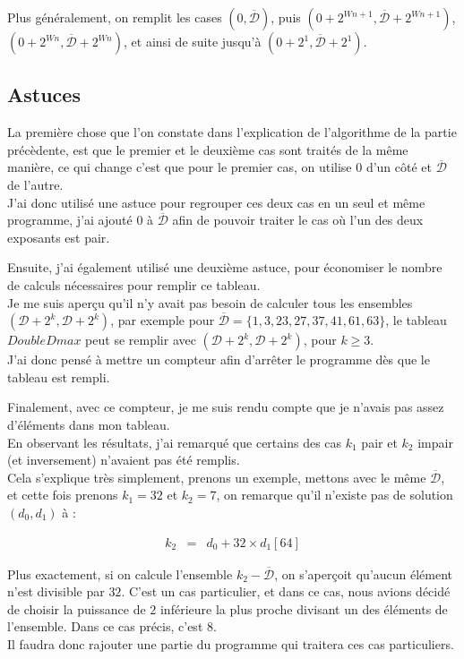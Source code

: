\documentclass[12pt, a4paper]{memoir}
\newcommand{\dbarre}{\overline{\mathcal{D}}}
\begin{document}
      Plus généralement, on remplit les cases $(0,\dbarre)$, puis $(0 + 2^{Wn+1},\dbarre + 2^{Wn+1})$, \\
      $(0 + 2^{Wn},\dbarre + 2^{Wn})$, et ainsi de suite jusqu'à $(0 + 2^1,\dbarre + 2^1)$.
      
    \subsection{Astuces}
      
      La première chose que l'on constate dans l'explication de l'algorithme de la partie précèdente, est que 
      le premier et le deuxième cas sont traités de la même manière, ce qui change c'est que pour le premier cas,
      on utilise $0$ d'un côté et $\dbarre$ de l'autre. \\
      J'ai donc utilisé une astuce pour regrouper ces deux cas en un seul et même programme, j'ai ajouté $0$ à $\dbarre$
      afin de pouvoir traiter le cas où l'un des deux exposants est pair.
      
      Ensuite, j'ai également utilisé une deuxième astuce, pour économiser le nombre de calculs nécessaires pour remplir ce tableau. \\
      Je me suis aperçu qu'il n'y avait pas besoin de calculer tous les ensembles $(\mathcal{D}+2^{k},\mathcal{D}+2^{k})$, par exemple
      pour $\dbarre = \{1,3,23,27,37,41,61,63\}$, le tableau $DoubleDmax$ peut se remplir avec $(\mathcal{D}+2^{k},\mathcal{D}+2^{k})$, pour $k \geq 3$. \\
      J'ai donc pensé à mettre un compteur afin d'arrêter le programme dès que le tableau est rempli.
      
      Finalement, avec ce compteur, je me suis rendu compte que je n'avais pas assez d'éléments dans mon tableau. \\
      En observant les résultats, j'ai remarqué que certains des cas $k_1$ pair et $k_2$ impair (et inversement) n'avaient pas
      été remplis. \\
      Cela s'explique très simplement, prenons un exemple, mettons avec le même $\dbarre$,
      et cette fois prenons $k_1 = 32$ et $k_2 = 7$, on remarque qu'il n'existe pas de solution $(d_0,d_1)$ à :
      
       $$\begin{array}{ccc}
k_2 & = & d_0 + 32 \times d_1[64]
   \end{array}$$
      
      Plus exactement, si on calcule l'ensemble $k_2 - \dbarre$, on s'aperçoit qu'aucun élément n'est divisible par $32$.
      C'est un cas particulier, et dans ce cas, nous avions décidé de choisir la puissance de $2$ inférieure la plus proche 
      divisant un des éléments de l'ensemble. Dans ce cas précis, c'est $8$. \\
      Il faudra donc rajouter une partie du programme qui traitera ces cas particuliers.
      
\end{document}
